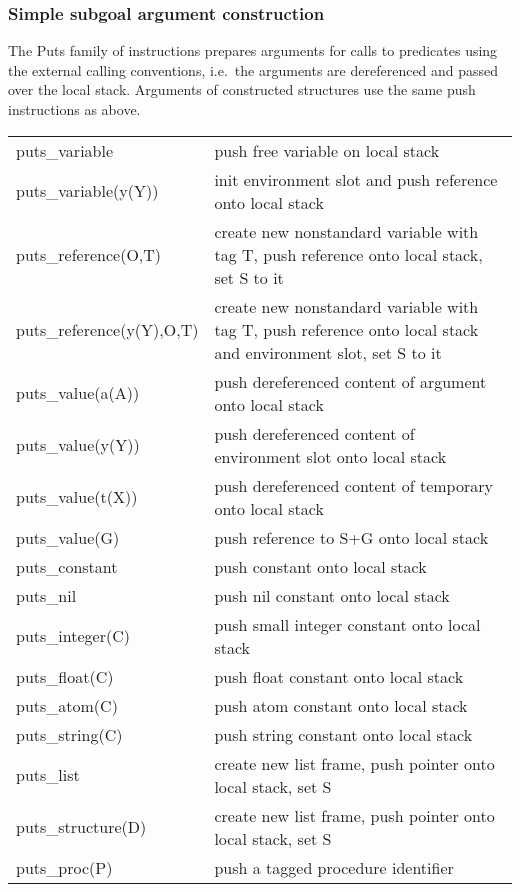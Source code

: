\subsubsection{Simple subgoal argument construction}
The Puts family of instructions prepares arguments for calls to predicates
using the external calling conventions, i.e.\ the arguments are dereferenced
and passed over the local stack.
Arguments of constructed structures use the same push instructions as above.

\begin{tabular}{|p{}|p{}|}
\hline
puts_variable           & push free variable on local stack \\
puts_variable(y(Y))     & init environment slot and push reference onto local stack \\
puts_reference(O,T)     & create new nonstandard variable with tag T, push reference onto local stack, set S to it \\
puts_reference(y(Y),O,T)& create new nonstandard variable with tag T, push reference onto local stack and environment slot, set S to it \\
puts_value(a(A))        & push dereferenced content of argument onto local stack \\
puts_value(y(Y))        & push dereferenced content of environment slot onto local stack \\
puts_value(t(X))        & push dereferenced content of temporary onto local stack \\
puts_value(G)           & push reference to S+G onto local stack \\
puts_constant           & push constant onto local stack \\
puts_nil                & push nil constant onto local stack \\
puts_integer(C)         & push small integer constant onto local stack \\
puts_float(C)           & push float constant onto local stack \\
puts_atom(C)            & push atom constant onto local stack \\
puts_string(C)          & push string constant onto local stack \\
puts_list               & create new list frame, push pointer onto local stack, set S \\
puts_structure(D)       & create new list frame, push pointer onto local stack, set S \\
puts_proc(P)            & push a tagged procedure identifier \\
\hline
\end{tabular}



